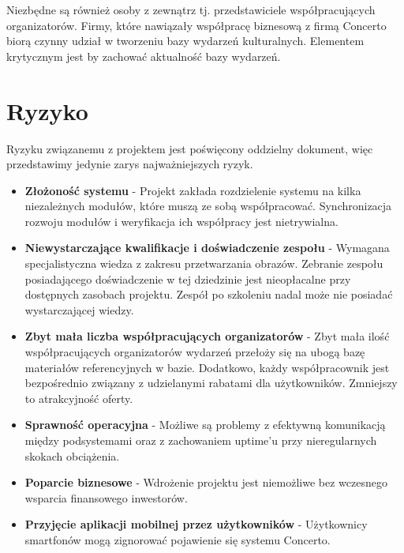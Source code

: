 \documentclass[10pt]{dokument-ppi}
\begin{document}
Niezbędne są również osoby z zewnątrz tj. przedstawiciele współpracujących organizatorów. Firmy, które nawiązały współpracę biznesową z firmą Concerto biorą czynny udział w tworzeniu bazy wydarzeń kulturalnych. Elementem krytycznym jest by zachować aktualność bazy wydarzeń.

\section{Ryzyko}
Ryzyku związanemu z projektem jest poświęcony oddzielny dokument, więc przedstawimy jedynie zarys najważniejszych ryzyk.

\begin{itemize}
  \item \textbf{Złożoność systemu} - Projekt zakłada rozdzielenie systemu na kilka niezależnych modułów, które muszą ze sobą współpracować. Synchronizacja rozwoju modułów i weryfikacja ich współpracy jest nietrywialna. 

  \item \textbf{Niewystarczające kwalifikacje i doświadczenie zespołu} -  Wymagana specjalistyczna wiedza z zakresu przetwarzania obrazów. Zebranie zespołu posiadającego doświadczenie w tej dziedzinie jest nieopłacalne przy dostępnych zasobach projektu. Zespół po szkoleniu nadal może nie posiadać wystarczającej wiedzy. 

  \item \textbf{Zbyt mała liczba współpracujących organizatorów} - Zbyt mała ilość współpracujących organizatorów wydarzeń przełoży się na ubogą bazę materiałów referencyjnych w bazie. Dodatkowo, każdy współpracownik jest bezpośrednio związany z udzielanymi rabatami dla użytkowników. Zmniejszy to atrakcyjność oferty.

  \item \textbf{Sprawność operacyjna} - Możliwe są problemy z efektywną komunikacją między podsystemami oraz z zachowaniem uptime'u przy nieregularnych skokach obciążenia.

  \item \textbf{Poparcie biznesowe} - Wdrożenie projektu jest niemożliwe bez wczesnego wsparcia finansowego inwestorów.

  \item \textbf{Przyjęcie aplikacji mobilnej przez użytkowników} - Użytkownicy smartfonów mogą zignorować pojawienie się systemu Concerto.
\end{itemize}

\newpage
\end{document}
